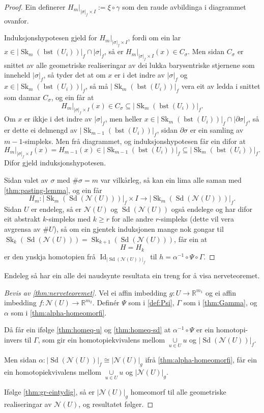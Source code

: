 \documentclass[a4paper, 12pt, norsk]{article}
\theoremstyle{plain}
\theoremstyle{definition}
\newcommand{\Rb}{\mathbb{R}}
\newcommand{\Nc}{\mathcal{N}}
\newcommand{\intersect}{ \mathop{\cap}\limits }
\newcommand{\union}{ \mathop{\cup}\limits }
\newcommand{\gr}[1]{ \lvert #1 \rvert } %
\DeclareMathOperator{\Sd}{Sd} %
\DeclareMathOperator{\bst}{bst} %
\DeclareMathOperator{\Sk}{Sk} %
\DeclareMathOperator{\Id}{Id} %
\begin{document}
\begin{proof}
	Ein definerer \( H_m|_{\gr{\sigma}_f \times I} := \xi \circ \gamma \) som den raude avbildinga i diagrammet ovanfor.

	Induksjonshypotesen gjeld for \( H_m|_{\gr{\sigma}_f \times I} \), fordi om ein lar \( x \in \gr{\Sk_m(\bst(U_i))}_f \intersect \gr{\sigma}_f \), så er \( H_m|_{\gr{\sigma}_f \times I}(x) \in C_\sigma \). Men sidan \( C_\sigma \) er snittet av alle geometriske realiseringar av dei lukka barysentriske stjernene som inneheld \( \gr{\sigma}_f \), så tyder det at om \( x \) er i det indre av \( \gr{\sigma}_f \) og \( x \in \gr{\Sk_m(\bst(U_i))}_f \), så må \( \gr{\Sk_m(\bst(U_i))}_f \) vera eit av ledda i snittet som dannar \( C_\sigma \), og ein får at
	\[
		H_m|_{\gr{\sigma}_f \times I}(x) \in C_\sigma \subseteq \gr{\Sk_m(\bst(U_i))}_f.
	\]
	Om \( x \) er ikkje i det indre av \( \gr{\sigma}_f \), men heller \( x \in \gr{\Sk_m(\bst(U_i))}_f \intersect \gr{\partial\sigma}_f \), så er dette ei delmengd av \( \gr{\Sk_{m-1}(\bst(U_i))}_f \), sidan \( \partial\sigma \) er ein samling av \( m-1 \)-simpleks. Men frå diagrammet, og induksjonshypotesen får ein difor at
	\[
		H_m|_{\gr{\sigma}_f \times I}(x) = H_{m-1}(x) \in \gr{\Sk_{m-1}(\bst(U_i))}_f \subseteq \gr{\Sk_{m}(\bst(U_i))}_f.
	\]
	Difor gjeld induksjonshypotesen.

	Sidan valet av \( \sigma \) med \( \#\sigma = m \) var vilkårleg, så kan ein lima alle saman med \autoref{thm:pasting-lemma}, og ein får
	\[
		H_m : \gr{\Sk_m(\Sd(\Nc(U)))}_f \times I \to \gr{\Sk_m(\Sd(\Nc(U)))}_f.
	\]
	Sidan \( U \) er endeleg, så er \( \Nc(U) \) og \( \Sd(\Nc(U)) \) også endelege og har difor eit abstrakt \( k \)-simpleks med \( k \geq r \) for alle andre \( r \)-simpleks (dette vil vera avgrensa av \( \#U \)), så om ein gjentek induksjonen mange nok gongar til \( \Sk_{k}(\Sd(\Nc(U))) = \Sk_{k+1}(\Sd(\Nc(U))) \), får ein at
	\[
		H = H_k
	\]
	er den ynskja homotopien frå \( \Id_{\gr{\Sd(\Nc(U))}_f} \) til \( h = \alpha^{-1} \circ \Psi \circ \Gamma \).
\end{proof}

Endeleg så har ein alle dei naudsynte resultata ein treng for å visa nerveteoremet.

\begin{proof}[Bevis av \autoref{thm:nerveteoremet}]
	Vel ei affin imbedding \( g: U \to \Rb^{m_1} \) og ei affin imbedding \( f: \Nc(U) \to \Rb^{m_2} \). Definér \( \Psi \) som i \autoref{def:Psi}, \( \Gamma \) som i \autoref{thm:Gamma}, og \( \alpha \) som i \autoref{thm:alpha-homeomorfi}.

	Då får ein ifølge \autoref{thm:homeq-u} og \autoref{thm:homeq-sd} at \( \alpha^{-1} \circ \Psi \) er ein homotopi-invers til \( \Gamma \), som gir ein homotopiekvivalens mellom \( \union_{u \in U} u \) og \( \gr{\Sd(\Nc(U))}_f \).

	Men sidan \( \alpha : \gr{\Sd(\Nc(U))}_f \cong \gr{\Nc(U)}_g \) ifrå \autoref{thm:alpha-homeomorfi}, får ein ein homotopiekvivalens mellom \( \union_{u \in U} u \) og \( \gr{\Nc(U)}_g \).

	Ifølge \autoref{thm:gr-eintydig}, så er \( \gr{\Nc(U)}_g \) homeomorf til alle geometriske realiseringar av \( \Nc(U) \), og resultatet følger.
\end{proof}
\end{document}
